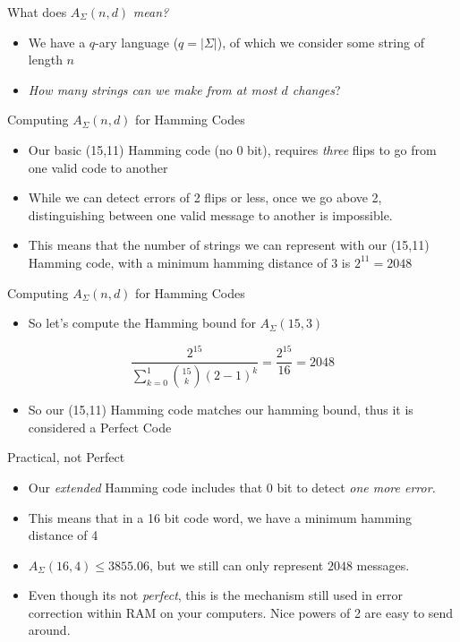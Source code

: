 \documentclass[aspectratio=169, handout]{beamer}
\makeatletter
\newcommand{\blu}[1]{{\color{sigma@mainblue}#1}}
\makeatother
\begin{document}
\begin{frame}{What does $A_\Sigma(n,d)$ \textit{mean?}}
    \begin{itemize}
        \item We have a $q$-ary language ($q = |\Sigma|$), of which we consider some string of length $n$ \pause
        \item \textit{How many strings can we make from at most $d$ changes}?
    \end{itemize}
\end{frame}

\begin{frame}{Computing $A_\Sigma(n,d)$ for Hamming Codes}

    \begin{itemize}
        \item Our basic (15,11) Hamming code (no 0 bit), requires \textit{three} flips to go from one valid code to another \pause
        \item While we can detect errors of 2 flips or less, once we go above 2, distinguishing between one valid message to another is impossible. \pause
        \item This means that the number of strings we can represent with our (15,11) Hamming code, with a minimum hamming distance of $3$ is $2^{11}= 2048$
    \end{itemize}
    
\end{frame}

\begin{frame}{Computing $A_\Sigma(n,d)$ for Hamming Codes}
    \begin{itemize}
        \item So let's compute the Hamming bound for $A_\Sigma(15,3)$ \pause
    \end{itemize}
    $$\frac{2^{15}}{\sum_{k=0}^1 \binom{15}{k}(2-1)^k} = \frac{2^{15}}{16} = 2048$$ \pause
    \begin{itemize}
        \item So our (15,11) Hamming code matches our hamming bound, thus it is considered a \blu{Perfect Code}
    \end{itemize}
\end{frame}

\begin{frame}{Practical, not Perfect}
    \begin{itemize}
        \item Our \textit{extended} Hamming code includes that 0 bit to detect \textit{one more error.} \pause
        \item This means that in a 16 bit code word, we have a minimum hamming distance of 4 \pause
        \item $A_\Sigma(16,4) \leq 3855.06$, but we still can only represent $2048$ messages. \pause
        \item Even though its not \textit{perfect}, this is the mechanism still used in error correction within RAM on your computers. Nice powers of 2 are easy to send around.
    \end{itemize}
\end{frame}
\end{document}
